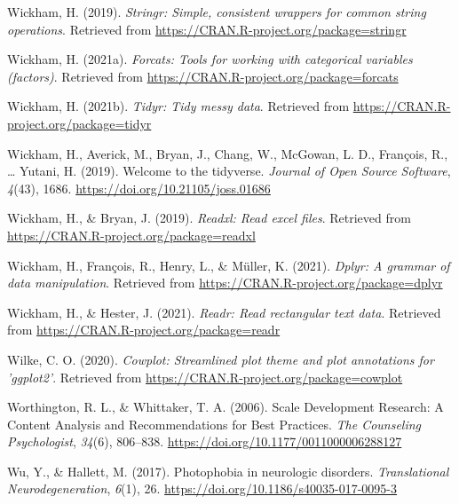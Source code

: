 \documentclass[
  english,
  man]{apa6}
\newlength{\cslhangindent}
\newlength{\cslentryspacingunit} %
\newenvironment{CSLReferences}[2] %
 {%
  \setlength{\parindent}{0pt}
  \ifodd #1
  \let\oldpar\par
  \def\par{\hangindent=\cslhangindent\oldpar}
  \fi
  \setlength{\parskip}{#2\cslentryspacingunit}
 }%
 {}
\begin{document}
\begin{CSLReferences}{1}{0}
\leavevmode{}%
Wickham, H. (2019). \emph{Stringr: Simple, consistent wrappers for common string operations}. Retrieved from \url{https://CRAN.R-project.org/package=stringr}

\leavevmode{}%
Wickham, H. (2021a). \emph{Forcats: Tools for working with categorical variables (factors)}. Retrieved from \url{https://CRAN.R-project.org/package=forcats}

\leavevmode{}%
Wickham, H. (2021b). \emph{Tidyr: Tidy messy data}. Retrieved from \url{https://CRAN.R-project.org/package=tidyr}

\leavevmode{}%
Wickham, H., Averick, M., Bryan, J., Chang, W., McGowan, L. D., François, R., \ldots{} Yutani, H. (2019). Welcome to the {tidyverse}. \emph{Journal of Open Source Software}, \emph{4}(43), 1686. \url{https://doi.org/10.21105/joss.01686}

\leavevmode{}%
Wickham, H., \& Bryan, J. (2019). \emph{Readxl: Read excel files}. Retrieved from \url{https://CRAN.R-project.org/package=readxl}

\leavevmode{}%
Wickham, H., François, R., Henry, L., \& Müller, K. (2021). \emph{Dplyr: A grammar of data manipulation}. Retrieved from \url{https://CRAN.R-project.org/package=dplyr}

\leavevmode{}%
Wickham, H., \& Hester, J. (2021). \emph{Readr: Read rectangular text data}. Retrieved from \url{https://CRAN.R-project.org/package=readr}

\leavevmode{}%
Wilke, C. O. (2020). \emph{Cowplot: Streamlined plot theme and plot annotations for 'ggplot2'}. Retrieved from \url{https://CRAN.R-project.org/package=cowplot}

\leavevmode{}%
Worthington, R. L., \& Whittaker, T. A. (2006). Scale {Development Research}: {A Content Analysis} and {Recommendations} for {Best Practices}. \emph{The Counseling Psychologist}, \emph{34}(6), 806--838. \url{https://doi.org/10.1177/0011000006288127}

\leavevmode{}%
Wu, Y., \& Hallett, M. (2017). Photophobia in neurologic disorders. \emph{Translational Neurodegeneration}, \emph{6}(1), 26. \url{https://doi.org/10.1186/s40035-017-0095-3}


\end{CSLReferences}
\end{document}
